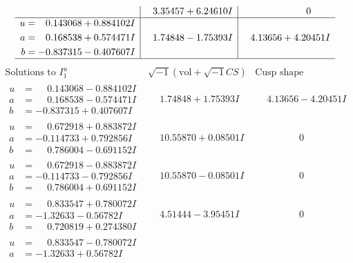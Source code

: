 \documentclass[1p]{elsarticle_modified}
\theoremstyle{definition}
\newcommand{\I}{\sqrt{-1}}
\begin{document}
$$\begin{array}{c|c|c}
 & \phantom{-}3.35457 + 6.24610 I & \phantom{-0.000000 } 0 \\ \hline\begin{aligned}
u &= \phantom{-}0.143068 + 0.884102 I \\
a &= \phantom{-}0.168538 + 0.574471 I \\
b &= -0.837315 - 0.407607 I\end{aligned}
 & \phantom{-}1.74848 - 1.75393 I & \phantom{-}4.13656 + 4.20451 I\\
 \hline 
 \end{array}$$\newpage$$\begin{array}{c|c|c}  
\text{Solutions to }I^u_{1}& \I (\text{vol} + \sqrt{-1}CS) & \text{Cusp shape}\\
 \hline 
\begin{aligned}
u &= \phantom{-}0.143068 - 0.884102 I \\
a &= \phantom{-}0.168538 - 0.574471 I \\
b &= -0.837315 + 0.407607 I\end{aligned}
 & \phantom{-}1.74848 + 1.75393 I & \phantom{-}4.13656 - 4.20451 I \\ \hline\begin{aligned}
u &= \phantom{-}0.672918 + 0.883872 I \\
a &= -0.114733 + 0.792856 I \\
b &= \phantom{-}0.786004 - 0.691152 I\end{aligned}
 & \phantom{-}10.55870 + 0.08501 I & \phantom{-0.000000 } 0 \\ \hline\begin{aligned}
u &= \phantom{-}0.672918 - 0.883872 I \\
a &= -0.114733 - 0.792856 I \\
b &= \phantom{-}0.786004 + 0.691152 I\end{aligned}
 & \phantom{-}10.55870 - 0.08501 I & \phantom{-0.000000 } 0 \\ \hline\begin{aligned}
u &= \phantom{-}0.833547 + 0.780072 I \\
a &= -1.32633 - 0.56782 I \\
b &= \phantom{-}0.720819 + 0.274380 I\end{aligned}
 & \phantom{-}4.51444 - 3.95451 I & \phantom{-0.000000 } 0 \\ \hline\begin{aligned}
u &= \phantom{-}0.833547 - 0.780072 I \\
a &= -1.32633 + 0.56782 I \\

\end{aligned}
\end{array}$$
\end{document}
